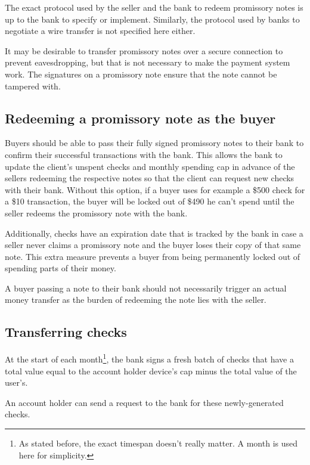 \documentclass[12pt,a4paper]{article}
\begin{document}
\begin{multicols}{2}
	The exact protocol used by the seller and the bank to redeem promissory notes is up to the bank to specify or implement. Similarly, the protocol used by banks to negotiate a wire transfer is not specified here either.

	It may be desirable to transfer promissory notes over a secure connection to prevent eavesdropping, but that is not necessary to make the payment system work. The signatures on a promissory note ensure that the note cannot be tampered with.
	
	\subsection{Redeeming a promissory note as the buyer}
	
	Buyers should be able to pass their fully signed promissory notes to their bank to confirm their successful transactions with the bank. This allows the bank to update the client's unspent checks and monthly spending cap in advance of the sellers redeeming the respective notes so that the client can request new checks with their bank. Without this option, if a buyer uses for example a \$500 check for a \$10 transaction, the buyer will be locked out of \$490 he can't spend until the seller redeems the promissory note with the bank.
	
	Additionally, checks have an expiration date that is tracked by the bank in case a seller never claims a promissory note and the buyer loses their copy of that same note. This extra measure prevents a buyer from being permanently locked out of spending parts of their money.
	
	A buyer passing a note to their bank should not necessarily trigger an actual money transfer as the burden of redeeming the note lies with the seller.
	

	\subsection{Transferring checks}

	At the start of each month\footnote{As stated before, the exact timespan doesn't really matter. A month is used here for simplicity.}, the bank signs a fresh batch of checks that have a total value equal to the account holder device's cap minus the total value of the user's.

	An account holder can send a request to the bank for these newly-generated checks.


\end{multicols}
\end{document}
